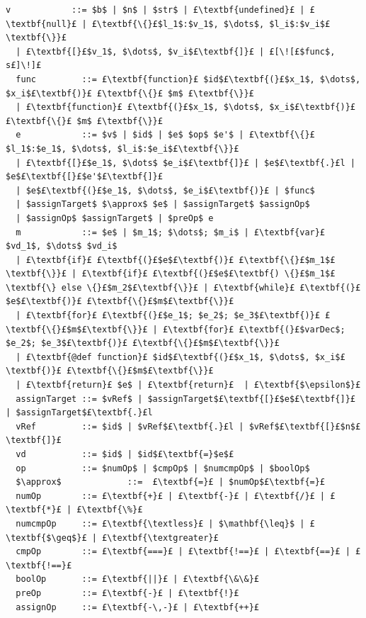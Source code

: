 \documentclass[12pt,a4paper,twoside,openright]{report}
\theoremstyle{definition}
\theoremstyle{dotless}
\begin{document}
\begin{lstlisting}[mathescape, escapechar=£]
  v            ::= $b$ | $n$ | $str$ | £\textbf{undefined}£ | £\textbf{null}£ | £\textbf{\{}£$l_1$:$v_1$, $\dots$, $l_i$:$v_i$£\textbf{\}}£
  | £\textbf{[}£$v_1$, $\dots$, $v_i$£\textbf{]}£ | £[\![£$func$, s£]\!]£
  func         ::= £\textbf{function}£ $id$£\textbf{(}£$x_1$, $\dots$, $x_i$£\textbf{)}£ £\textbf{\{}£ $m$ £\textbf{\}}£ 
  | £\textbf{function}£ £\textbf{(}£$x_1$, $\dots$, $x_i$£\textbf{)}£ £\textbf{\{}£ $m$ £\textbf{\}}£
  e            ::= $v$ | $id$ | $e$ $op$ $e'$ | £\textbf{\{}£$l_1$:$e_1$, $\dots$, $l_i$:$e_i$£\textbf{\}}£ 
  | £\textbf{[}£$e_1$, $\dots$ $e_i$£\textbf{]}£ | $e$£\textbf{.}£l | $e$£\textbf{[}£$e'$£\textbf{]}£ 
  | $e$£\textbf{(}£$e_1$, $\dots$, $e_i$£\textbf{)}£ | $func$
  | $assignTarget$ $\approx$ $e$ | $assignTarget$ $assignOp$ 
  | $assignOp$ $assignTarget$ | $preOp$ e
  m            ::= $e$ | $m_1$; $\dots$; $m_i$ | £\textbf{var}£ $vd_1$, $\dots$ $vd_i$ 
  | £\textbf{if}£ £\textbf{(}£$e$£\textbf{)}£ £\textbf{\{}£$m_1$£\textbf{\}}£ | £\textbf{if}£ £\textbf{(}£$e$£\textbf{) \{}£$m_1$£\textbf{\} else \{}£$m_2$£\textbf{\}}£ | £\textbf{while}£ £\textbf{(}£$e$£\textbf{)}£ £\textbf{\{}£$m$£\textbf{\}}£ 
  | £\textbf{for}£ £\textbf{(}£$e_1$; $e_2$; $e_3$£\textbf{)}£ £\textbf{\{}£$m$£\textbf{\}}£ | £\textbf{for}£ £\textbf{(}£$varDec$; $e_2$; $e_3$£\textbf{)}£ £\textbf{\{}£$m$£\textbf{\}}£ 
  | £\textbf{@def function}£ $id$£\textbf{(}£$x_1$, $\dots$, $x_i$£\textbf{)}£ £\textbf{\{}£$m$£\textbf{\}}£
  | £\textbf{return}£ $e$ | £\textbf{return}£  | £\textbf{$\epsilon$}£
  assignTarget ::= $vRef$ | $assignTarget$£\textbf{[}£$e$£\textbf{]}£ | $assignTarget$£\textbf{.}£l
  vRef         ::= $id$ | $vRef$£\textbf{.}£l | $vRef$£\textbf{[}£$n$£\textbf{]}£
  vd           ::= $id$ | $id$£\textbf{=}$e$£
  op           ::= $numOp$ | $cmpOp$ | $numcmpOp$ | $boolOp$
  $\approx$             ::=  £\textbf{=}£ | $numOp$£\textbf{=}£
  numOp        ::= £\textbf{+}£ | £\textbf{-}£ | £\textbf{/}£ | £\textbf{*}£ | £\textbf{\%}£
  numcmpOp     ::= £\textbf{\textless}£ | $\mathbf{\leq}$ | £\textbf{$\geq$}£ | £\textbf{\textgreater}£
  cmpOp        ::= £\textbf{===}£ | £\textbf{!==}£ | £\textbf{==}£ | £\textbf{!==}£
  boolOp       ::= £\textbf{||}£ | £\textbf{\&\&}£
  preOp        ::= £\textbf{-}£ | £\textbf{!}£
  assignOp     ::= £\textbf{-\,-}£ | £\textbf{++}£
\end{lstlisting}
\end{document}
